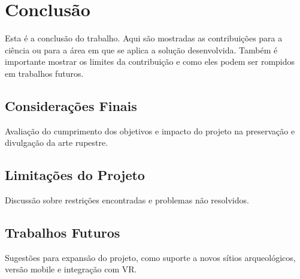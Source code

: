 \chapter{Conclusão}
\label{Conclusao}

Esta é a conclusão do trabalho. 
Aqui são mostradas as contribuições para a ciência ou para a área em que se aplica a solução desenvolvida.
Também é importante mostrar os limites da contribuição e como eles podem ser rompidos em trabalhos futuros.

\section{Considerações Finais}
\label{sec:consideracoes_finais}
Avaliação do cumprimento dos objetivos e impacto do projeto na preservação e divulgação da arte rupestre.

\section{Limitações do Projeto}
\label{sec:limitacoes}
Discussão sobre restrições encontradas e problemas não resolvidos.

\section{Trabalhos Futuros}
\label{sec:trabalhos_futuros}
Sugestões para expansão do projeto, como suporte a novos sítios arqueológicos, versão mobile e integração com VR.
